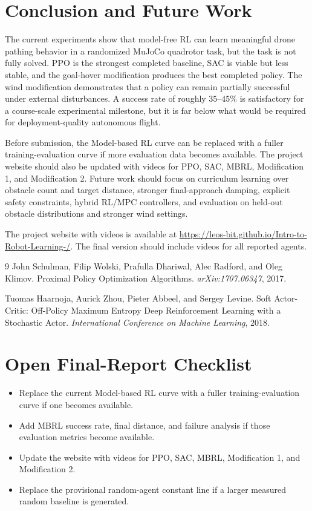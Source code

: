 \documentclass{article}
\begin{document}
\section{Conclusion and Future Work}
The current experiments show that model-free RL can learn meaningful drone pathing behavior in a randomized MuJoCo quadrotor task, but the task is not fully solved. PPO is the strongest completed baseline, SAC is viable but less stable, and the goal-hover modification produces the best completed policy. The wind modification demonstrates that a policy can remain partially successful under external disturbances. A success rate of roughly $35$--$45\%$ is satisfactory for a course-scale experimental milestone, but it is far below what would be required for deployment-quality autonomous flight.

Before submission, the Model-based RL curve can be replaced with a fuller training-evaluation curve if more evaluation data becomes available. The project website should also be updated with videos for PPO, SAC, MBRL, Modification 1, and Modification 2. Future work should focus on curriculum learning over obstacle count and target distance, stronger final-approach damping, explicit safety constraints, hybrid RL/MPC controllers, and evaluation on held-out obstacle distributions and stronger wind settings.

The project website with videos is available at \url{https://leos-bit.github.io/Intro-to-Robot-Learning-/}. The final version should include videos for all reported agents.

\begin{thebibliography}{9}
John Schulman, Filip Wolski, Prafulla Dhariwal, Alec Radford, and Oleg Klimov.
Proximal Policy Optimization Algorithms.
\emph{arXiv:1707.06347}, 2017.

Tuomas Haarnoja, Aurick Zhou, Pieter Abbeel, and Sergey Levine.
Soft Actor-Critic: Off-Policy Maximum Entropy Deep Reinforcement Learning with a Stochastic Actor.
\emph{International Conference on Machine Learning}, 2018.
\end{thebibliography}

\appendix
\section{Open Final-Report Checklist}
\begin{itemize}[leftmargin=1.2em]
    \item Replace the current Model-based RL curve with a fuller training-evaluation curve if one becomes available.
    \item Add MBRL success rate, final distance, and failure analysis if those evaluation metrics become available.
    \item Update the website with videos for PPO, SAC, MBRL, Modification 1, and Modification 2.
    \item Replace the provisional random-agent constant line if a larger measured random baseline is generated.
\end{itemize}
\end{document}
